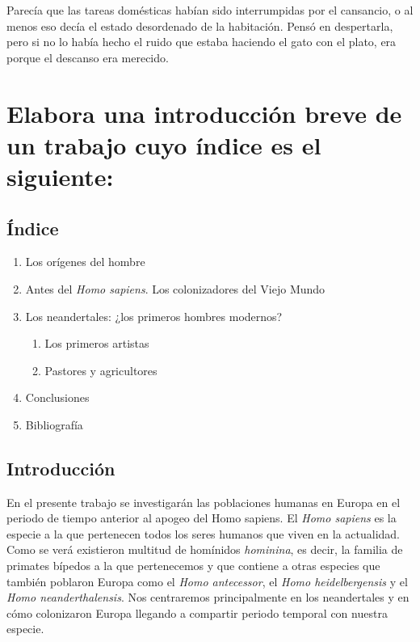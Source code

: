 \documentclass[12pt, a4paper, oneside]{report}
\begin{document}
        Parecía que las tareas domésticas habían sido interrumpidas por el cansancio, o al menos eso decía el
        estado desordenado de la habitación. Pensó en despertarla, pero si no lo había hecho el ruido que
        estaba haciendo el gato con el plato, era porque el descanso era merecido.
        \clearpage
    \chapter{Elabora una introducción breve de un trabajo cuyo índice es el siguiente:}
        \section*{Índice}
        \begin{Large}
            \renewcommand{\labelenumii}{\arabic{enumi}.\arabic{enumii}}
            \begin{enumerate}
                \item Los orígenes del hombre
                \item Antes del \emph{Homo sapiens}. Los colonizadores del Viejo Mundo
                \item Los neandertales: ¿los primeros hombres modernos?
                \begin{enumerate}
                    \item Los primeros artistas
                    \item Pastores y agricultores
                \end{enumerate}
                \item Conclusiones
                \item Bibliografía
            \end{enumerate}
        \end{Large}
        \clearpage
        \section*{Introducción}
            En el presente trabajo se investigarán las poblaciones humanas en Europa en el periodo de tiempo
            anterior al apogeo del Homo sapiens. El \emph{Homo sapiens} es la especie a la que pertenecen
            todos los seres humanos que viven en la actualidad. Como se verá existieron multitud de homínidos
            \emph{hominina}, es decir, la familia de primates bípedos a la que pertenecemos y que contiene a
            otras especies que también poblaron Europa como el \emph{Homo antecessor}, el
            \emph{Homo heidelbergensis} y el \emph{Homo neanderthalensis}. Nos centraremos principalmente en
            los neandertales y en cómo colonizaron Europa llegando a compartir periodo temporal con nuestra
            especie.
\end{document}
